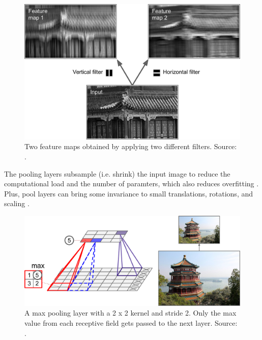 \documentclass[a4paper,11pt,oneside]{article}
\begin{document}
  \begin{figure}[ht]
    \begin{center}
      \includegraphics[width=.8\textwidth]{filters.png}
    \end{center}
    \caption{Two feature maps obtained by applying two different filters. Source: \cite{geron2019hands}.}
  \end{figure}

  The pooling layers subsample (i.e. shrink) the input image to reduce the computational load and the number of paramters,
  which also reduces overfitting \cite{geron2019hands}. Plus, pool layers can bring some invariance to small translations,
  rotations, and scaling \cite{geron2019hands}.

  \begin{figure}[ht]
    \begin{center}
      \includegraphics[width=.8\textwidth]{max_pooling.png}
    \end{center}
    \caption{A max pooling layer with a 2 x 2 kernel and stride 2. Only the max value from each receptive field
    gets passed to the next layer. Source: \cite{geron2019hands}.}
  \end{figure}
\end{document}
